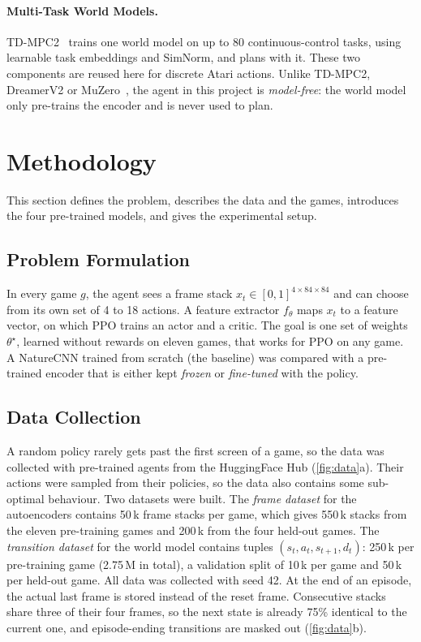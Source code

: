 \documentclass[runningheads,a4paper]{llncs}
\begin{document}
\paragraph{Multi-Task World Models.} TD-MPC2~\cite{hansen2024tdmpc2} trains one world model on up
to 80 continuous-control tasks, using learnable task embeddings and SimNorm, and plans with it.
These two components are reused here for discrete Atari actions. Unlike TD-MPC2, DreamerV2 or
MuZero~\cite{schrittwieser2020muzero}, the agent in this project is \emph{model-free}: the world
model only pre-trains the encoder and is never used to plan.

\section{Methodology}
\label{sec:method}
\suppressfloats[t]

This section defines the problem, describes the data and the games, introduces the four
pre-trained models, and gives the experimental setup.

\subsection{Problem Formulation}
\label{sec:prereq}

In every game $g$, the agent sees a frame stack
$x_t\in[0,1]^{4\times84\times84}$ and can choose from its own set of 4 to 18 actions. A feature
extractor $f_\theta$ maps $x_t$ to a feature vector, on which PPO trains an actor and a critic.
The goal is one set of weights $\theta^\star$, learned without rewards on eleven games, that
works for PPO on any game. A NatureCNN trained from scratch (the baseline) was compared with a
pre-trained encoder that is either kept \emph{frozen} or \emph{fine-tuned} with the policy.

\subsection{Data Collection}
\label{sec:data}

A random policy rarely gets past the first screen of a game, so the data was collected with pre-trained agents from the HuggingFace Hub (\cref{fig:data}a). Their actions were sampled from their policies, so the data also contains some sub-optimal
behaviour. Two datasets were built. The \emph{frame dataset} for the
autoencoders contains 50\,k frame stacks per game, which gives 550\,k stacks from the eleven
pre-training games and 200\,k from the four held-out games. The \emph{transition dataset} for
the world model contains tuples $(s_t,a_t,s_{t+1},d_t)$: 250\,k per pre-training game (2.75\,M in
total), a validation split of 10\,k per game and 50\,k per held-out game. All data was
collected with seed 42. At the end of an episode, the actual last frame is stored instead of the reset frame.
Consecutive stacks share three of their four frames, so the next state is already 75\%
identical to the current one, and episode-ending transitions are masked out (\cref{fig:data}b).
\end{document}
